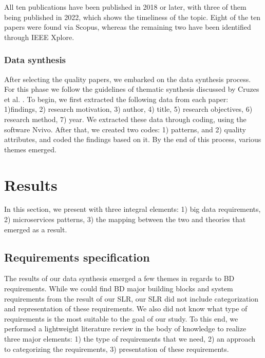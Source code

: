 \documentclass[conference]{IEEEtran}
\begin{document}

All ten publications have been published in 2018 or later, with three of them being published in 2022, which shows the timeliness of the topic. Eight of the ten papers were found via Scopus, whereas the remaining two have been identified through IEEE Xplore. 

\subsubsection{Data synthesis}

After selecting the quality papers, we embarked on the data synthesis process. For this phase we follow the guidelines of thematic synthesis discussed by Cruzes et al. \cite{Cruzes.2011}. To begin, we first extracted the following data from each paper: 1)findings, 2) research motivation, 3) author, 4) title, 5) research objectives, 6) research method, 7) year. We extracted these data through coding, using the software Nvivo. After that, we created two codes: 1) patterns, and 2) quality attributes, and coded the findings based on it. By the end of this process, various themes emerged. 





\section{Results}

In this section, we present with three integral elements: 1) big data requirements, 2) microservices patterns, 3) the mapping between the two and theories that emerged as a result.  

\subsection{Requirements specification}

The results of our data synthesis emerged a few themes in regards to BD requirements. While we could find BD major building blocks and system requirements from the result of our SLR, our SLR did not include categorization and representation of these requirements. We also did not know what type of requirements is the most suitable to the goal of our study. To this end, we performed a lightweight literature review in the body of knowledge to realize three major elements: 1) the type of requirements that we need, 2) an approach to categorizing the requirements, 3) presentation of these requirements. 
\end{document}
